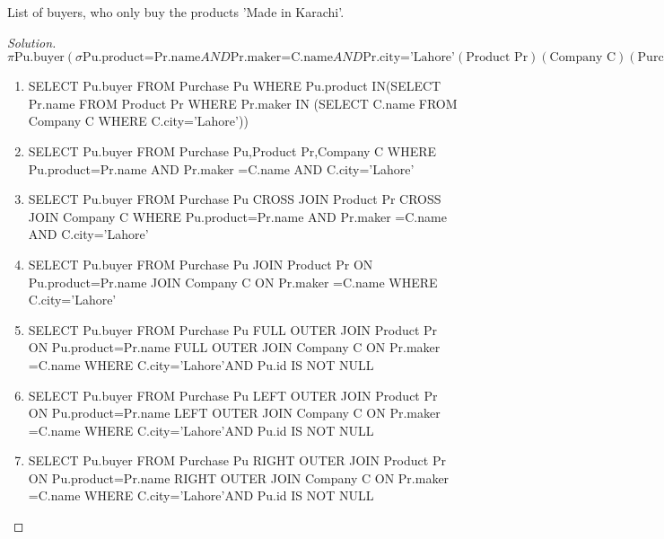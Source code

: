\documentclass[10pt,a4paper]{article}
\newenvironment{problem}[2][Problem]{\begin{trivlist}
\item[\hskip \labelsep {\bfseries #1}\hskip \labelsep {\bfseries #2.}]}{\end{trivlist}}
\begin{document}
\begin{problem}{6}
List of buyers, who only buy the products 'Made in Karachi'.
\end{problem}
\begin{proof}[Solution]
\begin{equation*}
\pi \text{Pu.buyer} (\sigma \text{Pu.product=Pr.name} AND \text{Pr.maker=C.name}   AND \text{Pr.city='Lahore'} (\text{Product Pr})(\text{Company C}) (\text{Purchase Pu})) )
\end{equation*}
\begin{enumerate}
	\item SELECT Pu.buyer FROM Purchase Pu WHERE Pu.product IN(SELECT Pr.name FROM Product Pr	WHERE Pr.maker IN (SELECT C.name FROM Company C WHERE C.city='Lahore'))
	\item SELECT Pu.buyer FROM Purchase Pu,Product Pr,Company C WHERE Pu.product=Pr.name AND Pr.maker =C.name AND C.city='Lahore'
	\item SELECT Pu.buyer FROM Purchase Pu CROSS JOIN Product Pr CROSS JOIN Company C WHERE Pu.product=Pr.name AND Pr.maker =C.name AND C.city='Lahore'
	\item SELECT Pu.buyer FROM Purchase Pu JOIN Product Pr ON Pu.product=Pr.name JOIN Company C ON Pr.maker =C.name WHERE C.city='Lahore'
	\item  SELECT Pu.buyer FROM Purchase Pu FULL OUTER JOIN Product Pr ON Pu.product=Pr.name FULL OUTER JOIN Company C ON Pr.maker =C.name WHERE C.city='Lahore'AND  Pu.id IS NOT NULL
	\item SELECT Pu.buyer FROM Purchase Pu LEFT OUTER JOIN Product Pr ON Pu.product=Pr.name LEFT OUTER JOIN Company C ON Pr.maker =C.name WHERE C.city='Lahore'AND  Pu.id IS NOT NULL 
	\item SELECT Pu.buyer FROM Purchase Pu RIGHT OUTER JOIN Product Pr ON Pu.product=Pr.name RIGHT OUTER JOIN Company C ON Pr.maker =C.name WHERE C.city='Lahore'AND  Pu.id IS NOT NULL
\end{enumerate}
\end{proof}
\end{document}
